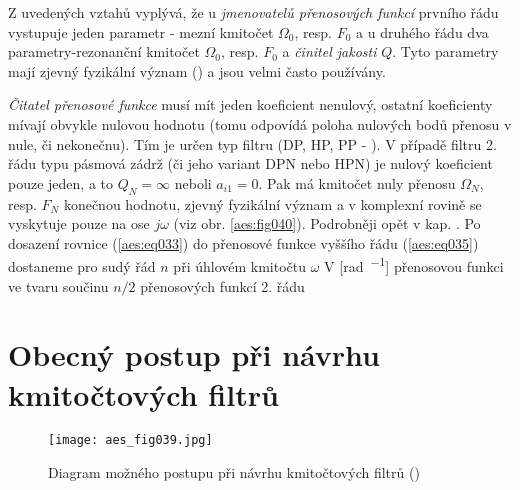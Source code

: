           Z uvedených vztahů vyplývá, že u \emph{jmenovatelů přenosových funkcí} prvního řádu
          vystupuje jeden parametr - mezní kmitočet \(\Omega_0\), resp. \(F_0\) a u druhého řádu dva
          parametry-rezonanční kmitočet \(\Omega_0\), resp. \(F_0\) a \emph{činitel jakosti} \(Q\).
          Tyto parametry mají zjevný fyzikální význam () a jsou
          velmi často používány. 
          
          \emph{Čitatel přenosové funkce} musí mít jeden koeficient nenulový, ostatní koeficienty
          mívají obvykle nulovou hodnotu (tomu odpovídá poloha nulových bodů přenosu v nule, či
          nekonečnu). Tím je určen typ filtru (DP, HP, PP - ). V případě
          filtru 2. řádu typu pásmová zádrž (či jeho variant DPN nebo HPN) je nulový koeficient
          pouze jeden, a to \(Q_N = \infty\) neboli \(a_{i1} = 0\). Pak má kmitočet nuly přenosu
          \(\Omega_N\), resp. \(F_N\) konečnou hodnotu, zjevný fyzikální význam a v komplexní rovině
          se vyskytuje pouze na ose \(j\omega\) (viz obr. \ref{aes:fig040}). Podrobněji opět v kap.
          . Po dosazení rovnice (\ref{aes:eq033}) do přenosové funkce
          vyššího řádu (\ref{aes:eq035}) dostaneme pro sudý řád \(n\) při úhlovém kmitočtu
          \(\omega\) V [\si{\radian\per\sec}] přenosovou funkci ve tvaru součinu \(n/2\) přenosových
          funkcí 2. řádu
          

  \section{Obecný postup při návrhu kmitočtových filtrů}
    \begin{figure}[ht!]  %
      \centering
      \texttt{[image: aes\_fig039.jpg]}
      \caption{Diagram možného postupu při návrhu kmitočtových filtrů
              (\cite[s.~44]{HajekSedlacek2002})}
      \label{aes:fig039}    
    \end{figure}

